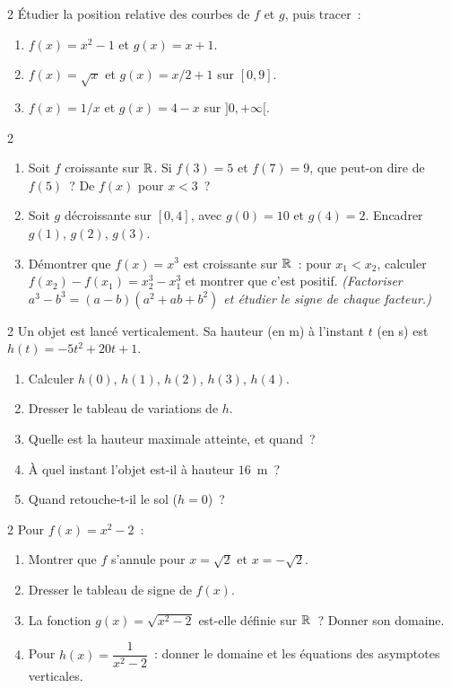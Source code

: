 \begin{exo}{2}
\'Etudier la position relative des courbes de $f$ et $g$, puis tracer~:
\begin{enumerate}
  \item $f(x)=x^2-1$ et $g(x)=x+1$.
  \item $f(x)=\sqrt{x}$ et $g(x)=x/2+1$ sur $[0,9]$.
  \item $f(x)=1/x$ et $g(x)=4-x$ sur $]0,+\infty[$.
\end{enumerate}
\end{exo}

\begin{exo}{2}
\begin{enumerate}
  \item Soit $f$ croissante sur $\mathbb{R}$. Si $f(3)=5$ et $f(7)=9$, que peut-on
        dire de $f(5)$~? De $f(x)$ pour $x<3$~?
  \item Soit $g$ d\'ecroissante sur $[0,4]$, avec $g(0)=10$ et $g(4)=2$.
        Encadrer $g(1)$, $g(2)$, $g(3)$.
  \item D\'emontrer que $f(x)=x^3$ est croissante sur $\mathbb{R}$~:
        pour $x_1<x_2$, calculer $f(x_2)-f(x_1)=x_2^3-x_1^3$
        et montrer que c'est positif.
        \emph{(Factoriser $a^3-b^3=(a-b)(a^2+ab+b^2)$ et \'etudier
        le signe de chaque facteur.)}
\end{enumerate}
\end{exo}

\begin{exo}{2}
Un objet est lanc\'e verticalement. Sa hauteur (en m) \`a l'instant $t$ (en s)
est $h(t) = -5t^2 + 20t + 1$.
\begin{enumerate}
  \item Calculer $h(0)$, $h(1)$, $h(2)$, $h(3)$, $h(4)$.
  \item Dresser le tableau de variations de $h$.
  \item Quelle est la hauteur maximale atteinte, et quand~?
  \item \`A quel instant l'objet est-il \`a hauteur $16$~m~?
  \item Quand retouche-t-il le sol ($h=0$)~?
\end{enumerate}
\end{exo}

\begin{exo}{2}
Pour $f(x)=x^2-2$~:
\begin{enumerate}
  \item Montrer que $f$ s'annule pour $x=\sqrt{2}$ et $x=-\sqrt{2}$.
  \item Dresser le tableau de signe de $f(x)$.
  \item La fonction $g(x)=\sqrt{x^2-2}$ est-elle d\'efinie sur $\mathbb{R}$~?
        Donner son domaine.
  \item Pour $h(x)=\dfrac{1}{x^2-2}$~: donner le domaine et les
        \'equations des asymptotes verticales.
\end{enumerate}
\end{exo}

